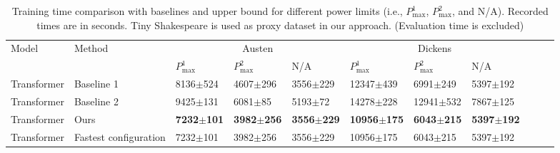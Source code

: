 \begin{table*}[tb!]
  \caption{Training time comparison with baselines and upper bound for different power limits (i.e., $P_\text{{max}}^{1}$, $P_{\text{max}}^{2}$, and N/A). Recorded times are in seconds. Tiny Shakespeare is used as proxy dataset in our approach. (Evaluation time is excluded)}
  \label{table:comparison_with_baseline_nano_transformers}
  \centering
  \begin{adjustbox}{width=\columnwidth,center}
  \begin{tabular}{lllllllllll}
    \toprule
    Model       & Method                & \multicolumn{3}{c}{Austen}          & \multicolumn{3}{c}{Dickens} \\
    \cmidrule(r){3-5} \cmidrule(r){6-8}
                &                       & $P_\text{{max}}^{1}$ &$P_\text{{max}}^{2}$&N/A  &$P_{\text{max}}^{1}$&$P_{\text{max}}^{2}$& N/A \\
    \midrule

    
    Transformer    & Baseline 1            &8136$\pm$524   &4607$\pm$296   &3556$\pm$229     &12347$\pm$439   &6991$\pm$249   &5397$\pm$192 \\
    Transformer    & Baseline 2            &9425$\pm$131   &6081$\pm$85    &5193$\pm$72      &14278$\pm$228  &12941$\pm$532  &7867$\pm$125 \\
    Transformer    & Ours                  &\textbf{7232$\pm$101}   &\textbf{3982$\pm$256}   &\textbf{3556$\pm$229}     &\textbf{10956$\pm$175}   &\textbf{6043$\pm$215}   &\textbf{5397$\pm$192}  \\
    Transformer    & Fastest configuration &7232$\pm$101   &3982$\pm$256   &3556$\pm$229     &10956$\pm$175   &6043$\pm$215   & 5397$\pm$192  \\
    \bottomrule
  \end{tabular}
  \end{adjustbox}
\end{table*}

